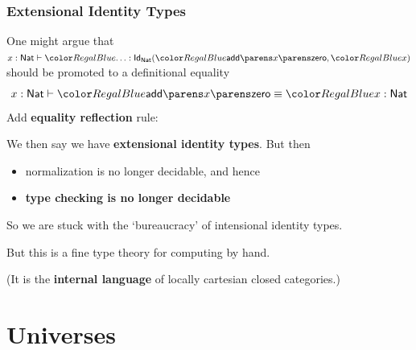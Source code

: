 \documentclass[handout]{beamer} %
\begin{document}
\begin{frame}
  \frametitle{Extensional Identity Types}
  
  One might argue that $
    \IsTm[x : \Nat]{\ldots}{
      \Id{\Nat}{
        \App{\App{\textsf{add}}{x}}{\Zero}
      }{
        x
      }
    }
  $
  should be promoted to a definitional equality
  \[
    \EqTm[x : \Nat]{
      \App{\App{\textsf{add}}{x}}{\Zero}
    }{
      x
    }{\Nat}
  \]
  Add \textbf{equality reflection} rule: %
  \begin{mathpar}
  \end{mathpar}
  We then say we have \textbf{extensional identity types}. But then
  \begin{itemize}
    \item normalization is no longer decidable, and hence
    \item \textbf{type checking is no longer decidable}
  \end{itemize}
  

  So we are stuck with the `bureaucracy' of intensional identity types.
  
  \medskip
  
  But this is a fine type theory for computing by hand.

  (It is the \textbf{internal language} of locally cartesian closed categories.)

\end{frame}

\section{Universes}
\end{document}
